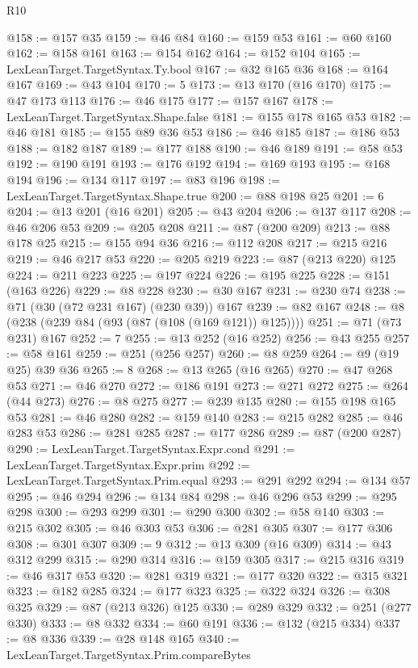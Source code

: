 \begin{lexlean}{R10}
\begin{coremodule}
@158 := @157 @35
@159 := @46 @84
@160 := @159 @53
@161 := @60 @160
@162 := @158 @161
@163 := @154 @162
@164 := @152 @104
@165 := LexLeanTarget.TargetSyntax.Ty.bool
@167 := @32 @165 @36
@168 := @164 @167
@169 := @43 @104
@170 := 5
@173 := @13 @170 (@16 @170)
@175 := @47 @173 @113
@176 := @46 @175
@177 := @157 @167
@178 := LexLeanTarget.TargetSyntax.Shape.false
@181 := @155 @178 @165 @53
@182 := @46 @181
@185 := @155 @89 @36 @53
@186 := @46 @185
@187 := @186 @53
@188 := @182 @187
@189 := @177 @188
@190 := @46 @189
@191 := @58 @53
@192 := @190 @191
@193 := @176 @192
@194 := @169 @193
@195 := @168 @194
@196 := @134 @117
@197 := @83 @196
@198 := LexLeanTarget.TargetSyntax.Shape.true
@200 := @88 @198 @25
@201 := 6
@204 := @13 @201 (@16 @201)
@205 := @43 @204
@206 := @137 @117
@208 := @46 @206 @53
@209 := @205 @208
@211 := @87 (@200 @209)
@213 := @88 @178 @25
@215 := @155 @94 @36
@216 := @112 @208
@217 := @215 @216
@219 := @46 @217 @53
@220 := @205 @219
@223 := @87 (@213 @220) @125
@224 := @211 @223
@225 := @197 @224
@226 := @195 @225
@228 := @151 (@163 @226)
@229 := @8 @228
@230 := @30 @167
@231 := @230 @74
@238 := @71 (@30 (@72 @231 @167) (@230 @39)) @167
@239 := @82 @167
@248 := @8 (@238 (@239 @84 (@93 (@87 (@108 (@169 @121)) @125))))
@251 := @71 (@73 @231) @167
@252 := 7
@255 := @13 @252 (@16 @252)
@256 := @43 @255
@257 := @58 @161
@259 := @251 (@256 @257)
@260 := @8 @259
@264 := @9 (@19 @25) @39 @36
@265 := 8
@268 := @13 @265 (@16 @265)
@270 := @47 @268 @53
@271 := @46 @270
@272 := @186 @191
@273 := @271 @272
@275 := @264 (@44 @273)
@276 := @8 @275
@277 := @239 @135
@280 := @155 @198 @165 @53
@281 := @46 @280
@282 := @159 @140
@283 := @215 @282
@285 := @46 @283 @53
@286 := @281 @285
@287 := @177 @286
@289 := @87 (@200 @287)
@290 := LexLeanTarget.TargetSyntax.Expr.cond
@291 := LexLeanTarget.TargetSyntax.Expr.prim
@292 := LexLeanTarget.TargetSyntax.Prim.equal
@293 := @291 @292
@294 := @134 @57
@295 := @46 @294
@296 := @134 @84
@298 := @46 @296 @53
@299 := @295 @298
@300 := @293 @299
@301 := @290 @300
@302 := @58 @140
@303 := @215 @302
@305 := @46 @303 @53
@306 := @281 @305
@307 := @177 @306
@308 := @301 @307
@309 := 9
@312 := @13 @309 (@16 @309)
@314 := @43 @312 @299
@315 := @290 @314
@316 := @159 @305
@317 := @215 @316
@319 := @46 @317 @53
@320 := @281 @319
@321 := @177 @320
@322 := @315 @321
@323 := @182 @285
@324 := @177 @323
@325 := @322 @324
@326 := @308 @325
@329 := @87 (@213 @326) @125
@330 := @289 @329
@332 := @251 (@277 @330)
@333 := @8 @332
@334 := @60 @191
@336 := @132 (@215 @334)
@337 := @8 @336
@339 := @28 @148 @165
@340 := LexLeanTarget.TargetSyntax.Prim.compareBytes

\end{coremodule}
\end{lexlean}
